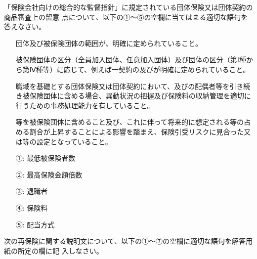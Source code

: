 \documentclass[report,gutter=10mm,fore-edge=10mm,uplatex,dvipdfmx]{jlreq}
\begin{document}
「保険会社向けの総合的な監督指針」に規定されている団体保険又は団体契約の商品審査上の留意
点について、以下の①～⑤の空欄に当てはまる適切な語句を答えなさい。

\begin{itemize}
\item[] 団体及び被保険団体の範囲が、明確に定められていること。
\item[] 被保険団体の区分（全員加入団体、任意加入団体）及び団体の区分（第Ⅰ種から第Ⅳ種等）に応じて、例えば一契約の及びが明確に定められていること。
\item[] 職域を基礎とする団体保険又は団体契約において、及びの配偶者等を引き続き被保険団体に含める場合、異動状況の把握及び保険料の収納管理を適切に行うための事務処理能力を有していること。
\item[]  等を被保険団体に含めること及び、これに伴って将来的に想定される等の占める割合が上昇することによる影響を踏まえ、保険引受リスクに見合った又は等の設定となっていること。
\end{itemize}

\answer{}
\begin{itemize}
\item[ ①: ] 最低被保険者数
\item[ ②: ] 最高保険金額倍数
\item[ ③: ] 退職者
\item[ ④: ] 保険料
\item[ ⑤: ] 配当方式
\end{itemize}

次の再保険に関する説明文について、以下の①～⑦の空欄に適切な語句を解答用紙の所定の欄に記
入しなさい。
\end{document}
